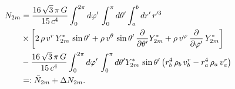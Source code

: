 \documentclass[aspectratio=169]{beamer}
\begin{document}
\begin{frame}

  \begin{align*}
  N_{2m}&=\frac{16\,\sqrt{3}\,\pi\,G}{15\,c^{4}}
  \int_{0}^{2\pi}d\varphi'\,\int_{0}^{\pi}d\theta'\int_{a}^{b}dr'\,r'^{3}\\
  &\times\left[2\,\rho\,v^{r}\,Y^{*}_{2m}\,\sin\theta'
  +\rho\,v^{\theta}\,\sin\theta'\,\frac{\partial}{\partial\theta'}Y^{*}_{2m}
  +\rho\,v^{\varphi}\,\frac{\partial}{\partial\varphi'}\,Y^{*}_{2m}\right]\\
  &-\frac{16\,\sqrt{3}\,\pi\,G}{15\,c^{4}}
  \int_{0}^{2\pi}d\varphi'\,\int_{0}^{\pi}d\theta'
  Y^{*}_{2m}\,\sin\theta'\left(r_{b}^{4}\,\rho_{b}\,v_{b}^{r}
  -r_{a}^{4}\,\rho_{a}\,v_{a}^{r}\right)\\
  &=:\bar{N}_{2m}+\Delta N_{2m}.
  \end{align*}

\end{frame}
\end{document}
